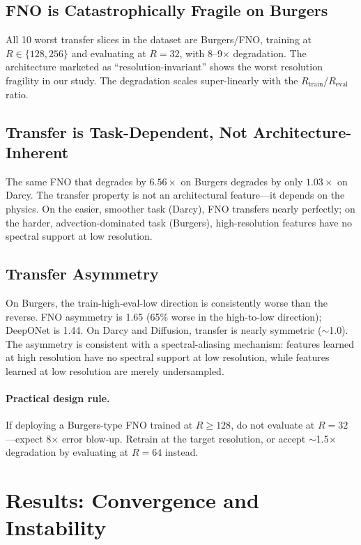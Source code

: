 \documentclass[11pt]{article}
\newcommand{\Reval}{R_{\mathrm{eval}}}
\newcommand{\Rtrain}{R_{\mathrm{train}}}
\newcommand{\fnoWorstDeg}{6.56}
\newcommand{\darcyFnoWorstDeg}{1.03}
\begin{document}
\subsection{FNO is Catastrophically Fragile on Burgers}

All 10 worst transfer slices in the dataset are Burgers/FNO, training
at $R \in \{128, 256\}$ and evaluating at $R{=}32$, with 8--9$\times$
degradation. The architecture marketed as ``resolution-invariant''
shows the worst resolution fragility in our study. The degradation
scales super-linearly with the $\Rtrain / \Reval$ ratio.

\subsection{Transfer is Task-Dependent, Not Architecture-Inherent}

The same FNO that degrades by $\fnoWorstDeg{\times}$ on Burgers
degrades by only $\darcyFnoWorstDeg{\times}$ on Darcy. The transfer
property is not an architectural feature---it depends on the physics.
On the easier, smoother task (Darcy), FNO transfers nearly perfectly;
on the harder, advection-dominated task (Burgers), high-resolution
features have no spectral support at low resolution.

\subsection{Transfer Asymmetry}

On Burgers, the train-high-eval-low direction is consistently worse
than the reverse. FNO asymmetry is 1.65 (65\% worse in the
high-to-low direction); DeepONet is 1.44. On Darcy and Diffusion,
transfer is nearly symmetric ($\sim$1.0). The asymmetry is consistent
with a spectral-aliasing mechanism: features learned at high resolution
have no spectral support at low resolution, while features learned at
low resolution are merely undersampled.

\paragraph{Practical design rule.}
If deploying a Burgers-type FNO trained at $R \geq 128$, do not
evaluate at $R{=}32$---expect 8$\times$ error blow-up. Retrain at
the target resolution, or accept $\sim$1.5$\times$ degradation by
evaluating at $R{=}64$ instead.


\section{Results: Convergence and Instability}
\label{sec:convergence}
\end{document}
